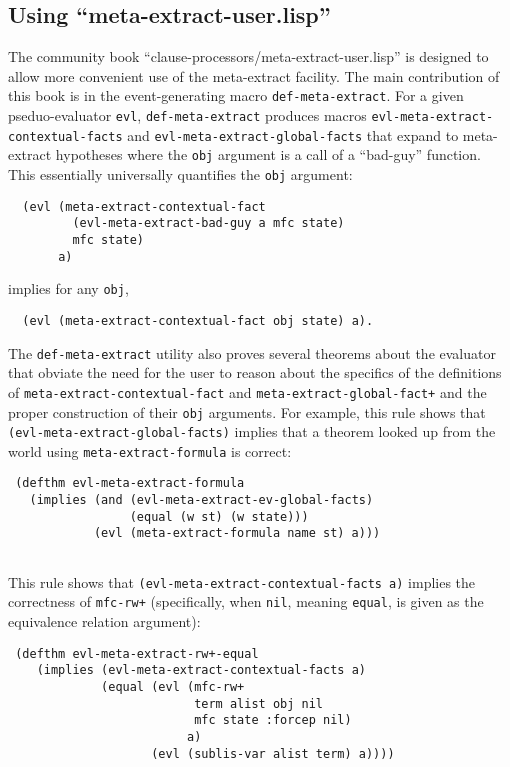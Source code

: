 \subsection{Using ``meta-extract-user.lisp''}

The community book ``clause-processors/meta-extract-user.lisp'' is
designed to allow more convenient use of the meta-extract facility.
The main contribution of this book is in the event-generating macro
\texttt{def-meta-extract}. For a given pseduo-evaluator \texttt{evl},
\texttt{def-meta-extract} produces macros
\texttt{evl-meta-extract-contextual-facts} and
\texttt{evl-meta-extract-global-facts} that expand to meta-extract
hypotheses where the \texttt{obj} argument is a call of a ``bad-guy''
function.  This essentially universally quantifies the \texttt{obj}
argument:
\begin{verbatim}
  (evl (meta-extract-contextual-fact
         (evl-meta-extract-bad-guy a mfc state)
         mfc state)
       a)
\end{verbatim}
implies for any \texttt{obj},
\begin{verbatim}
  (evl (meta-extract-contextual-fact obj state) a).
\end{verbatim}

The \texttt{def-meta-extract} utility also proves several theorems
about the evaluator that obviate the need for the user to reason about
the specifics of the definitions of
\texttt{meta-extract-contextual-fact} and
\texttt{meta-extract-global-fact+} and the proper construction of
their \texttt{obj} arguments.  For example, this rule shows that
\texttt{(evl-meta-extract-global-facts)} implies that a theorem looked
up from the world using \texttt{meta-extract-formula} is correct:
\begin{verbatim}
 (defthm evl-meta-extract-formula
   (implies (and (evl-meta-extract-ev-global-facts)
                 (equal (w st) (w state)))
            (evl (meta-extract-formula name st) a)))
 
\end{verbatim}
This rule shows that
\texttt{(evl-meta-extract-contextual-facts a)} implies the correctness
of \texttt{mfc-rw+} (specifically, when \texttt{nil}, meaning
\texttt{equal}, is given as the equivalence relation argument):
\begin{verbatim}
 (defthm evl-meta-extract-rw+-equal
    (implies (evl-meta-extract-contextual-facts a)
             (equal (evl (mfc-rw+
                          term alist obj nil
                          mfc state :forcep nil)
                         a)
                    (evl (sublis-var alist term) a))))
\end{verbatim}

